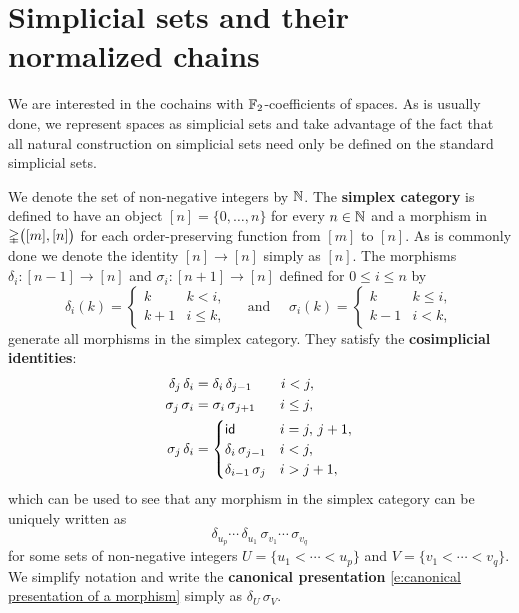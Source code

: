 
\section{Simplicial sets and their normalized chains} \label{s:preliminaries}

We are interested in the cochains with ${\mathbb{F}_2}$-coefficients of spaces.
As is usually done, we represent spaces as simplicial sets and take advantage of the fact that all natural construction on simplicial sets need only be defined on the standard simplicial sets.

We denote the set of non-negative integers by $\mathbb{N}$.
The \textbf{simplex category} is defined to have an object $[n] = \{0, \dots, n\}$ for every $n \in \mathbb{N}$ and a morphism in $\mathbb{\Delta} \big([m], [n] \big)$ for each order-preserving function from $[m]$ to $[n]$.
As is commonly done we denote the identity $[n] \to [n]$ simply as $[n]$.
The morphisms $\delta_i \colon [n-1] \to [n]$ and $\sigma_i \colon [n+1] \to [n]$ defined for $0 \leq i \leq n$ by
\[
\delta_i(k) =
\begin{cases} k & k < i, \\ k+1 & i \leq k, \end{cases}
\quad \text{ and } \quad
\sigma_i(k) =
\begin{cases} k & k \leq i, \\ k-1 & i < k, \end{cases}
\]
generate all morphisms in the simplex category.
They satisfy the \textbf{cosimplicial identities}:
\[
\begin{split}
\delta_j \, \delta_i &=
\delta_i \, \delta_{j-1} \hspace*{20.9pt} i < j, \\
\sigma_j \, \sigma_i &=
\sigma_i \, \sigma_{j+1} \hspace*{17.9pt} i \leq j, \\
\sigma_j \, \delta_i &=
\begin{cases}
\mathsf{id} & i = j,\, j+1, \\
\delta_i \, \sigma_{j-1} & i < j, \\
\delta_{i-1} \, \sigma_{j} & i > j + 1,
\end{cases}
\end{split}
\]
which can be used to see that any morphism in the simplex category can be uniquely written as
\begin{equation} \label{e:canonical presentation of a morphism}
\delta_{u_{p}} \cdots\, \delta_{u_1}\, \sigma_{v_1} \cdots\, \sigma_{v_q}
\end{equation}
for some sets of non-negative integers $U = \{u_1 < \cdots < u_{p}\}$ and $V = \{v_1 < \cdots < v_{q}\}$.
We simplify notation and write the \textbf{canonical presentation} \eqref{e:canonical presentation of a morphism} simply as $\delta_U\, \sigma_V$.

